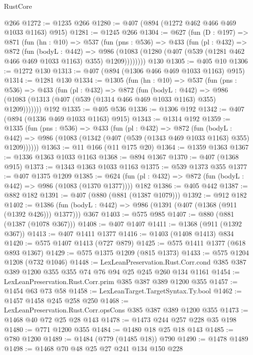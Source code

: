 \begin{lexlean}{RustCore}
\begin{coremodule}
{\begin{coremodule}
{{{{{{    @266
@1272 := @1235 @266
@1280 := @407 (@894 (@1272 @462 @466 @469 @1033 @1163) @915)
@1281 := @1245 @266
@1304 := @627
    (fun (D : @197) =>
    @871
      (fun (hn : @10) =>
      @537
        (fun (pns : @536) =>
        @433
          (fun (pl : @432) =>
          @872
            (fun (bodyL : @442) =>
            @986 (@1083 (@1280 (@407 (@539 (@1281 @462 @466 @469 @1033 @1163) @355) @1209))))))))
    @130
@1305 := @405 @10
@1306 := @1272 @130
@1313 := @407 (@894 (@1306 @466 @469 @1033 @1163) @915)
@1314 := @1281 @130
@1334 := @1305
    (fun (hn : @10) =>
    @537
      (fun (pns : @536) =>
      @433
        (fun (pl : @432) =>
        @872
          (fun (bodyL : @442) =>
          @986 (@1083 (@1313 (@407 (@539 (@1314 @466 @469 @1033 @1163) @355) @1209)))))))
    @192
@1335 := @405 @536
@1336 := @1306 @192
@1342 := @407 (@894 (@1336 @469 @1033 @1163) @915)
@1343 := @1314 @192
@1359 := @1335
    (fun (pns : @536) =>
    @433
      (fun (pl : @432) =>
      @872
        (fun (bodyL : @442) =>
        @986 (@1083 (@1342 (@407 (@539 (@1343 @469 @1033 @1163) @355) @1209))))))
@1363 := @11 @166 (@11 @175 @20)
@1364 := @1359 @1363
@1367 := @1336 @1363 @1033 @1163
@1368 := @894 @1367
@1370 := @407 (@1368 @915)
@1373 := @1343 @1363 @1033 @1163
@1375 := @539 @1373 @355
@1377 := @407 @1375 @1209
@1385 := @624 (fun (pl : @432) => @872 (fun (bodyL : @442) => @986 (@1083 (@1370 @1377)))) @182
@1386 := @405 @442
@1387 := @882 @182
@1391 := @407 (@880 (@881 (@1387 @1079)))
@1392 := @912 @182
@1402 := @1386 (fun (bodyL : @442) => @986 (@1391 (@407 (@1368 (@911 (@1392 @426))) @1377))) @367
@1403 := @575 @985
@1407 := @880 (@881 (@1387 (@1078 @367)))
@1408 := @407 @1407
@1411 := @1368 (@911 (@1392 @367))
@1413 := @407 @1411 @1377
@1416 := @1403 (@1408 @1413) @834
@1420 := @575 @1407 @1413 (@727 @879)
@1425 := @575 @1411 @1377 (@618 @893 @1367)
@1429 := @575 @1375 @1209 (@815 @1373)
@1433 := @575 @1204 @1208 (@732 @1046)
@1448 := LexLeanPreservation.Rust.Corr.cond
    @385
    @387
    @389
    @1200
    @355
    @355
    @74
    @76
    @94
    @25
    @245
    @260
    @134
    @1161
@1454 := LexLeanPreservation.Rust.Corr.prim @385 @387 @389 @1200 @355
@1457 := @1454 @63 @73 @58
@1458 := LexLeanTarget.TargetSyntax.Ty.bool
@1462 := @1457 @1458 @245 @258 @250
@1468 := LexLeanPreservation.Rust.Corr.opsCons @385 @387 @389 @1200 @355
@1473 := @1468 @40 @72 @25 @28 @143
@1478 := @1473 @244 @257 @228 @35 @198
@1480 := @771 @1200 @355
@1484 := @1480 @18 @25 @18 @143
@1485 := @780 @1200
@1489 := @1484 (@779 (@1485 @18)) @790
@1490 := @1478 @1489
@1498 := @1468 @70 @48 @25 @27 @241 @134 @150 @228
}}}}}}
\end{coremodule}}
\end{coremodule}
\end{lexlean}
